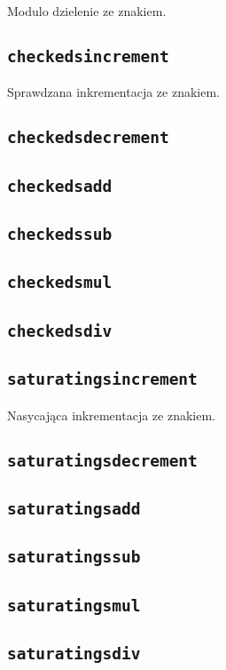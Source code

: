 Modulo dzielenie ze znakiem.

\subsection{\texttt{checkedsincrement}}

Sprawdzana inkrementacja ze znakiem.

\subsection{\texttt{checkedsdecrement}}
\subsection{\texttt{checkedsadd}}
\subsection{\texttt{checkedssub}}
\subsection{\texttt{checkedsmul}}
\subsection{\texttt{checkedsdiv}}

\subsection{\texttt{saturatingsincrement}}

Nasycająca inkrementacja ze znakiem.

\subsection{\texttt{saturatingsdecrement}}
\subsection{\texttt{saturatingsadd}}
\subsection{\texttt{saturatingssub}}
\subsection{\texttt{saturatingsmul}}
\subsection{\texttt{saturatingsdiv}}
